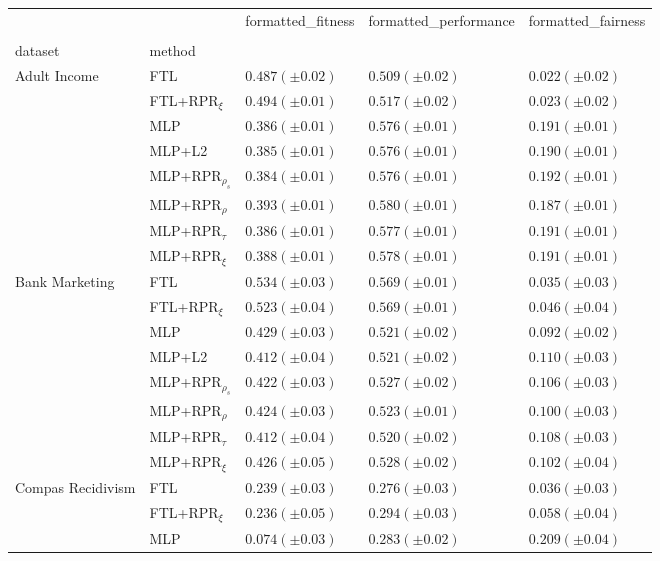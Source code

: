 \begin{tabular}{lllll}
\toprule
 &  & formatted_fitness & formatted_performance & formatted_fairness \\
 &  &  &  &  \\
dataset & method &  &  &  \\
\midrule
\multirow[t]{8}{*}{Adult Income} & FTL & $0.487 (\pm0.02)$ & $0.509 (\pm0.02)$ & $0.022 (\pm0.02)$ \\
 & FTL+RPR$_{\xi}$ & $0.494 (\pm0.01)$ & $0.517 (\pm0.02)$ & $0.023 (\pm0.02)$ \\
 & MLP & $0.386 (\pm0.01)$ & $0.576 (\pm0.01)$ & $0.191 (\pm0.01)$ \\
 & MLP+L2 & $0.385 (\pm0.01)$ & $0.576 (\pm0.01)$ & $0.190 (\pm0.01)$ \\
 & MLP+RPR$_{\rho_s}$ & $0.384 (\pm0.01)$ & $0.576 (\pm0.01)$ & $0.192 (\pm0.01)$ \\
 & MLP+RPR$_{\rho}$ & $0.393 (\pm0.01)$ & $0.580 (\pm0.01)$ & $0.187 (\pm0.01)$ \\
 & MLP+RPR$_{\tau}$ & $0.386 (\pm0.01)$ & $0.577 (\pm0.01)$ & $0.191 (\pm0.01)$ \\
 & MLP+RPR$_{\xi}$ & $0.388 (\pm0.01)$ & $0.578 (\pm0.01)$ & $0.191 (\pm0.01)$ \\
\cline{1-5}
\multirow[t]{8}{*}{Bank Marketing} & FTL & $0.534 (\pm0.03)$ & $0.569 (\pm0.01)$ & $0.035 (\pm0.03)$ \\
 & FTL+RPR$_{\xi}$ & $0.523 (\pm0.04)$ & $0.569 (\pm0.01)$ & $0.046 (\pm0.04)$ \\
 & MLP & $0.429 (\pm0.03)$ & $0.521 (\pm0.02)$ & $0.092 (\pm0.02)$ \\
 & MLP+L2 & $0.412 (\pm0.04)$ & $0.521 (\pm0.02)$ & $0.110 (\pm0.03)$ \\
 & MLP+RPR$_{\rho_s}$ & $0.422 (\pm0.03)$ & $0.527 (\pm0.02)$ & $0.106 (\pm0.03)$ \\
 & MLP+RPR$_{\rho}$ & $0.424 (\pm0.03)$ & $0.523 (\pm0.01)$ & $0.100 (\pm0.03)$ \\
 & MLP+RPR$_{\tau}$ & $0.412 (\pm0.04)$ & $0.520 (\pm0.02)$ & $0.108 (\pm0.03)$ \\
 & MLP+RPR$_{\xi}$ & $0.426 (\pm0.05)$ & $0.528 (\pm0.02)$ & $0.102 (\pm0.04)$ \\
\cline{1-5}
\multirow[t]{8}{*}{Compas Recidivism} & FTL & $0.239 (\pm0.03)$ & $0.276 (\pm0.03)$ & $0.036 (\pm0.03)$ \\
 & FTL+RPR$_{\xi}$ & $0.236 (\pm0.05)$ & $0.294 (\pm0.03)$ & $0.058 (\pm0.04)$ \\
 & MLP & $0.074 (\pm0.03)$ & $0.283 (\pm0.02)$ & $0.209 (\pm0.04)$ \\

\end{tabular}
